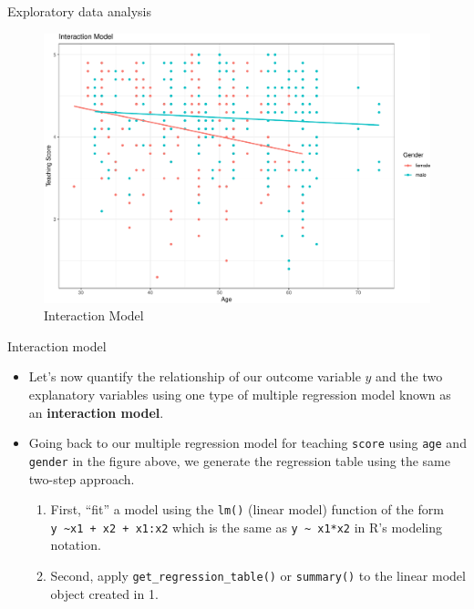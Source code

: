 \documentclass[
  ignorenonframetext,
]{beamer}
\providecommand{\tightlist}{%
  \setlength{\itemsep}{0pt}\setlength{\parskip}{0pt}}
\begin{document}
\begin{frame}{Exploratory data analysis}
\protect\hypertarget{exploratory-data-analysis-13}{}
\normalsize
\begin{figure}

{\centering \includegraphics[width=0.9\linewidth,height=0.9\textheight]{Week5_Lect_files/figure-beamer/interaction-1} 

}

\caption{Interaction Model}\label{fig:interaction}
\end{figure}
\normalsize
\end{frame}

\begin{frame}[fragile]{Interaction model}
\protect\hypertarget{interaction-model}{}
\begin{itemize}
\item
  Let's now quantify the relationship of our outcome variable \(y\) and
  the two explanatory variables using one type of multiple regression
  model known as an \textbf{interaction model}.
\item
  Going back to our multiple regression model for teaching
  \texttt{score} using \texttt{age} and \texttt{gender} in the figure
  above, we generate the regression table using the same two-step
  approach.

  \begin{enumerate}
  \tightlist
  \item
    First, ``fit'' a model using the \texttt{lm()} (linear model)
    function of the form
    \texttt{y\ \textasciitilde{}x1\ +\ x2\ +\ x1:x2} which is the same
    as \texttt{y\ \textasciitilde{}\ x1*x2} in R's modeling notation.
  \item
    Second, apply \texttt{get\_regression\_table()} or
    \texttt{summary()} to the linear model object created in 1.
  \end{enumerate}
\end{itemize}
\end{frame}
\end{document}
